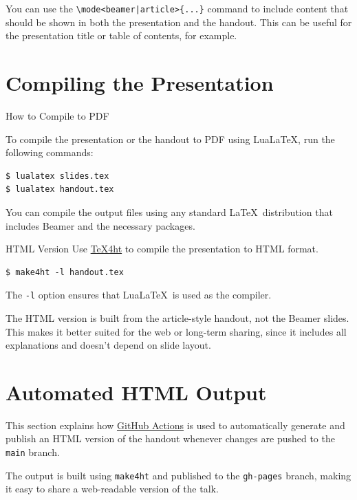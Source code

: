 You can use the \verb+\mode<beamer|article>{...}+ command to include content that should be
shown in both the presentation and the handout. This can be useful for
the presentation title or table of contents, for example.




\section{Compiling the Presentation}

\begin{frame}[fragile]{How to Compile to PDF} 

To compile the presentation or the handout to PDF using LuaLaTeX, run the following commands:

\begin{verbatim}
$ lualatex slides.tex
$ lualatex handout.tex
\end{verbatim}
\end{frame}

You can compile the output files using any standard \LaTeX\ distribution that includes Beamer and the necessary packages.

\begin{frame}[fragile]{HTML Version}
  Use \href{https://www.tug.org/tex4ht/}{\TeX4ht} to compile the presentation to HTML format. 
\begin{verbatim}
$ make4ht -l handout.tex    
\end{verbatim}

The \verb|-l| option  ensures that Lua\LaTeX\ is used as the compiler. 
\end{frame}


The HTML version is built from the article-style handout, not the Beamer slides.
This makes it better suited for the web or long-term sharing, since it includes
all explanations and doesn’t depend on slide layout.

\section{Automated HTML Output}

This section explains how \href{https://docs.github.com/en/actions/writing-workflows/quickstart}{GitHub Actions}
is used to automatically generate and publish an HTML version of the handout whenever changes are pushed to the \texttt{main} branch.

The output is built using \texttt{make4ht} and published to the \texttt{gh-pages} branch,
making it easy to share a web-readable version of the talk.

